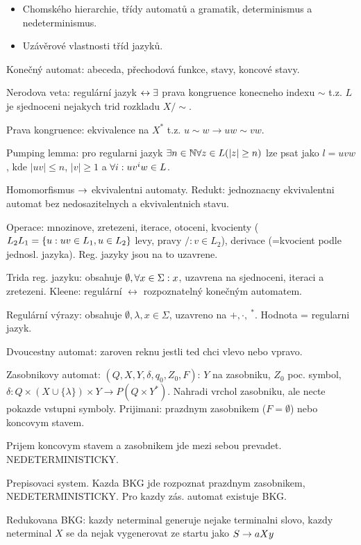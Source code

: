\begin{itemize}
\item Chomského hierarchie, třídy automatů a gramatik, determinismus a
nedeterminismus.
\item Uzávěrové vlastnosti tříd jazyků.
\end{itemize}

Konečný automat: abeceda, přechodová funkce, stavy, koncové stavy.

Nerodova veta: regulární jazyk $\leftrightarrow \exists$ prava kongruence konecneho
indexu $\sim$ t.z. $L$ je sjednoceni nejakych trid rozkladu $X/\sim$.

Prava kongruence: ekvivalence na $X^*$ t.z. $u\sim w\rightarrow uw\sim vw$.

Pumping lemma: pro regularni jazyk $\exists n\in\mathbb{N} \forall z\in L (|z|\geq n)$ lze
psat jako $l=uvw$, kde $|uv|\leq n$, $|v|\geq 1$ a $\forall i: uv^i w\in L$.

Homomorfismus $\rightarrow$ ekvivalentni automaty. Redukt: jednoznacny
ekvivalentni automat bez nedosazitelnych a ekvivalentnich stavu.

Operace: mnozinove, zretezeni, iterace, otoceni, kvocienty ($L_2\\ L_1=\{u:uv\in
L_1, u\in L_2\}$ levy, pravy $/: v\in L_2$), derivace (=kvocient podle jednosl.
jazyka). Reg. jazyky jsou na to uzavrene.

Trida reg. jazyku: obsahuje $\emptyset, \forall x\in\Sigma: x$, uzavrena na
sjednoceni, iteraci a zretezeni. Kleene: regulární $\leftrightarrow$
rozpoznatelný konečným automatem.

Regulární výrazy: obsahuje $\emptyset, \lambda, x\in\Sigma$, uzavreno na
$+,\cdot,\ ^*$. Hodnota = regularni jazyk.

Dvoucestny automat: zaroven reknu jestli ted chci vlevo nebo vpravo.

Zasobnikovy automat: $(Q,X,Y,\delta,q_0,Z_0,F)$: $Y$ na zasobniku, $Z_0$ poc.
symbol, $\delta:Q\times (X\cup\{\lambda\})\times Y\rightarrow P(Q\times Y^*)$.
Nahradi vrchol zasobniku, ale necte pokazde vstupni symboly.
Prijimani: prazdnym zasobnikem ($F=\emptyset$) nebo koncovym stavem.

Prijem koncovym stavem a zasobnikem jde mezi sebou prevadet.
NEDETERMINISTICKY.

Prepisovaci system.
Kazda BKG jde rozpoznat prazdnym zasobnikem, NEDETERMINISTICKY.
Pro kazdy zás. automat existuje BKG.

Redukovana BKG: kazdy neterminal generuje nejake terminalni slovo,
kazdy neterminal $X$ se da nejak vygenerovat ze startu jako $S\rightarrow aXy$

